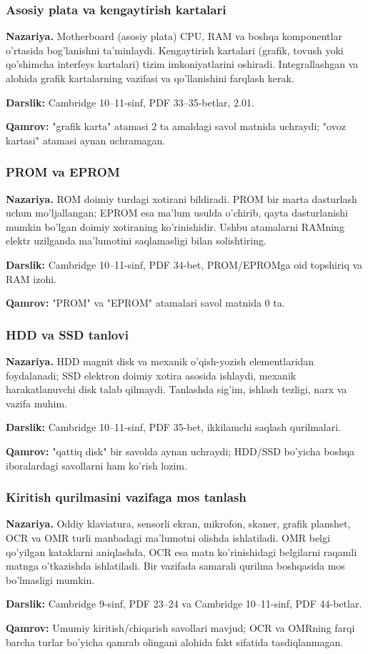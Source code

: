 \documentclass[10pt,a4paper]{article}
\begin{document}
\subsubsection*{Asosiy plata va kengaytirish kartalari}
\textbf{Nazariya.} Motherboard (asosiy plata) CPU, RAM va boshqa
komponentlar o'rtasida bog'lanishni ta'minlaydi. Kengaytirish
kartalari (grafik, tovush yoki qo'shimcha interfeys kartalari)
tizim imkoniyatlarini oshiradi. Integrallashgan va alohida
grafik kartalarning vazifasi va qo'llanishini farqlash kerak.
\par\textbf{Darslik:} Cambridge 10--11-sinf, PDF 33--35-betlar, 2.01.
\par\textbf{Qamrov:} "grafik karta" atamasi 2 ta amaldagi savol
matnida uchraydi; "ovoz kartasi" atamasi aynan uchramagan.
\subsubsection*{PROM va EPROM}
\textbf{Nazariya.} ROM doimiy turdagi xotirani bildiradi.
PROM bir marta dasturlash uchun mo'ljallangan; EPROM esa
ma'lum usulda o'chirib, qayta dasturlanishi mumkin bo'lgan
doimiy xotiraning ko'rinishidir. Ushbu atamalarni RAMning
elektr uzilganda ma'lumotini saqlamasligi bilan solishtiring.
\par\textbf{Darslik:} Cambridge 10--11-sinf, PDF 34-bet,
PROM/EPROMga oid topshiriq va RAM izohi.
\par\textbf{Qamrov:} "PROM" va "EPROM" atamalari savol matnida 0 ta.
\subsubsection*{HDD va SSD tanlovi}
\textbf{Nazariya.} HDD magnit disk va mexanik o'qish-yozish
elementlaridan foydalanadi; SSD elektron doimiy xotira asosida
ishlaydi, mexanik harakatlanuvchi disk talab qilmaydi.
Tanlashda sig'im, ishlash tezligi, narx va vazifa muhim.
\par\textbf{Darslik:} Cambridge 10--11-sinf, PDF 35-bet,
ikkilamchi saqlash qurilmalari.
\par\textbf{Qamrov:} "qattiq disk" bir savolda aynan uchraydi;
HDD/SSD bo'yicha boshqa iboralardagi savollarni ham ko'rish lozim.
\subsubsection*{Kiritish qurilmasini vazifaga mos tanlash}
\textbf{Nazariya.} Oddiy klaviatura, sensorli ekran, mikrofon,
skaner, grafik planshet, OCR va OMR turli manbadagi ma'lumotni
olishda ishlatiladi. OMR belgi qo'yilgan kataklarni aniqlashda,
OCR esa matn ko'rinishidagi belgilarni raqamli matnga
o'tkazishda ishlatiladi. Bir vazifada samarali qurilma boshqasida
mos bo'lmasligi mumkin.
\par\textbf{Darslik:} Cambridge 9-sinf, PDF 23--24 va
Cambridge 10--11-sinf, PDF 44-betlar.
\par\textbf{Qamrov:} Umumiy kiritish/chiqarish savollari mavjud;
OCR va OMRning farqi barcha turlar bo'yicha qamrab olingani alohida
fakt sifatida tasdiqlanmagan.
\end{document}
